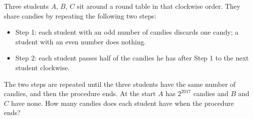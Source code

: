 Three students $A$, $B$, $C$ sit around a round table in that clockwise order. They share candies by repeating the following two steps:
\begin{itemize}
\item Step 1: each student with an odd number of candies discards one candy; a student with an even number does nothing.
\item Step 2: each student passes half of the candies he has after Step 1 to the next student clockwise.
\end{itemize}
The two steps are repeated until the three students have the same number of candies, and then the procedure ends. At the start $A$ has $2^{2017}$ candies and $B$ and $C$ have none. How many candies does each student have when the procedure ends?
